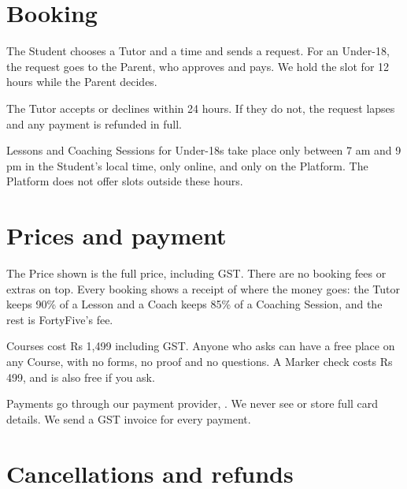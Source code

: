\documentclass[11pt]{article}
\begin{document}
\section{Booking}

\begin{clauses}
  \item The Student chooses a Tutor and a time and sends a request. For an Under-18, the request goes to the Parent, who approves and pays. We hold the slot for 12 hours while the Parent decides.
  \item The Tutor accepts or declines within 24 hours. If they do not, the request lapses and any payment is refunded in full.
  \item Lessons and Coaching Sessions for Under-18s take place only between 7 am and 9 pm in the Student's local time, only online, and only on the Platform. The Platform does not offer slots outside these hours.
\end{clauses}

\section{Prices and payment}

\begin{clauses}
  \item The Price shown is the full price, including GST. There are no booking fees or extras on top. Every booking shows a receipt of where the money goes: the Tutor keeps 90\% of a Lesson and a Coach keeps 85\% of a Coaching Session, and the rest is FortyFive's fee.
  \item Courses cost Rs 1,499 including GST. Anyone who asks can have a free place on any Course, with no forms, no proof and no questions. A Marker check costs Rs 499, and is also free if you ask.
  \item Payments go through our payment provider, . We never see or store full card details. We send a GST invoice for every payment.
\end{clauses}

\section{Cancellations and refunds}
\end{document}
